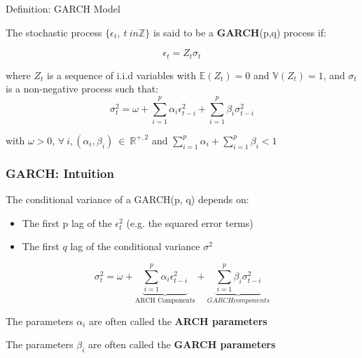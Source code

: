 \documentclass{beamer}
\newenvironment{wideitemize}{\itemize\addtolength{\itemsep}{10pt}}{\enditemize}
\begin{document}
\begin{frame}
\begin{block}{Definition: GARCH Model}

  The stochastic process $\{ \epsilon_t, \ t \ in \mathbb{Z} \}$ is said to be a \textbf{GARCH}(p,q) process if:

  \begin{equation*}
    \epsilon_t = Z_t \sigma_t
  \end{equation*}

  \medskip

  where $Z_t$ is a sequence of i.i.d variables with $\mathbb{E}(Z_t) = 0$ and $\mathbb{V}(Z_t) = 1$, and $\sigma_t$ is a non-negative process such that:
  \begin{equation*}
    \sigma^2_t = \omega + \sum^p_{i=1} \alpha_i \epsilon^2_{t-i} + \sum^p_{i=1} \beta_i \sigma^2_{t-i}
  \end{equation*}

  \medskip

  with $\omega >0$, $\forall \ i, (\alpha_i, \beta_i) \ \in \ \mathbb{R}^{+,2}$ and $\sum^p_{i=1} \alpha_i + \sum^p_{i=1} \beta_i <1$  
\end{block}
\end{frame}


\begin{frame}
  \frametitle{GARCH: Intuition}
  \begin{wideitemize}
  \item The conditional variance of a GARCH(p, q) depends on:
    \begin{itemize}
    \item The first p lag of the $\epsilon_t^2$ (e.g. the squared error terms)
    \item The first $q$ lag of the conditional variance $\sigma^2$
    \end{itemize}

 \begin{equation*}
    \sigma^2_t = \omega + \underbrace{\sum^p_{i=1} \alpha_i \epsilon^2_{t-i}}_{\text{ARCH Components}} + \underbrace{\sum^p_{i=1} \beta_i \sigma^2_{t-i}}_{GARCH components}
  \end{equation*}
    
   
  \item The parameters $\alpha_i$ are often called the \textbf{ARCH parameters}
  \item The parameters $\beta_i$ are often called the \textbf{GARCH parameters}
\end{wideitemize}
  
\end{frame}
\end{document}
